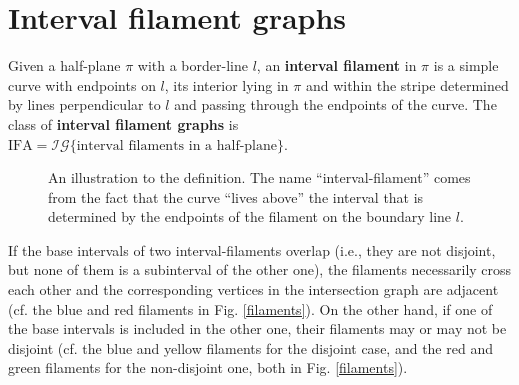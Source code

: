 \chapter{Interval filament graphs}

\begin{defn}
	Given a half-plane $\pi$ with a border-line $l$, an \textbf{interval filament} in $\pi$ is a simple curve with
	endpoints on $l$, its interior lying in $\pi$ and within the stripe determined by lines perpendicular to $l$ and
	passing through the endpoints of the curve. The class of \textbf{interval filament graphs} is $\text{IFA} = \mathcal{IG}\{\text{interval filaments in a half-plane}\}$.
\end{defn}

\begin{figure}[!ht]\centering
	\caption{An illustration to the definition. The name “interval-filament” comes from the fact that the curve “lives above” the interval that is determined by the endpoints of the filament on the boundary line $l$.}
\end{figure}

\begin{comm}
	If the base intervals of two interval-filaments overlap (i.e., they are not disjoint, but none of them is a subinterval of the other one), the filaments necessarily cross each other and the corresponding vertices in the intersection graph are adjacent (cf. the blue and red filaments in Fig. \ref{filaments}). On the other hand, if one of the base intervals is included in the other one, their filaments may or may not be disjoint (cf. the blue and yellow filaments for the disjoint case, and the red and green filaments for the non-disjoint one, both in Fig. \ref{filaments}).
\end{comm}


